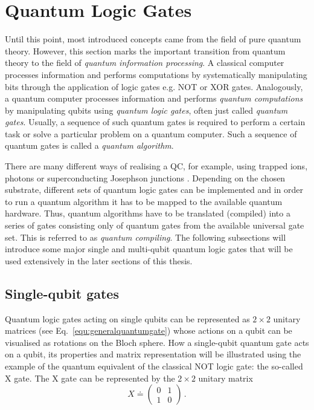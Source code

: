 \section{Quantum Logic Gates}
\label{subsec:quantumlogicgates}
Until this point, most introduced concepts came from the field of pure quantum theory. However, this section marks the important transition from quantum theory to the field of \emph{quantum information processing}. A classical computer processes information and performs computations by systematically manipulating bits through the application of logic gates e.g. NOT or XOR gates. Analogously, a quantum computer processes information and performs \emph{quantum computations} by manipulating qubits using \emph{quantum logic gates}, often just called \emph{quantum gates}. Usually, a sequence of such quantum gates is required to perform a certain task or solve a particular problem on a quantum computer. Such a sequence of quantum gates is called a \emph{quantum algorithm}. 

There are many different ways of realising a QC, for example, using trapped ions, photons or superconducting Josephson junctions \cite{clarke2008superconducting,haffner2008quantum,o2007optical}. Depending on the chosen substrate, different sets of quantum logic gates can be implemented and in order to run a quantum algorithm it has to be mapped to the available quantum hardware. Thus, quantum algorithms have to be translated (compiled) into a series of gates consisting only of quantum gates from the available universal gate set. This is referred to as \emph{quantum compiling}. The following subsections will introduce some major single and multi-qubit quantum logic gates that will be used extensively in the later sections of this thesis.

\subsection{Single-qubit gates}
\label{subsubsec:singlequbitgates} 
Quantum logic gates acting on single qubits can be represented as $2\times2$ unitary matrices (see Eq.~\ref{equ:generalquantumgate}) whose actions on a qubit can be visualised as rotations on the Bloch sphere. How a single-qubit quantum gate acts on a qubit, its properties and matrix representation will be illustrated using the example of the quantum equivalent of the classical NOT logic gate: the so-called X gate. The X gate can be represented by the $2\times2$ unitary matrix
\begin{equation}
X \doteq \begin{pmatrix}
 0 & 1 \\ 
 1 & 0
 \end{pmatrix}\, .
\end{equation}

